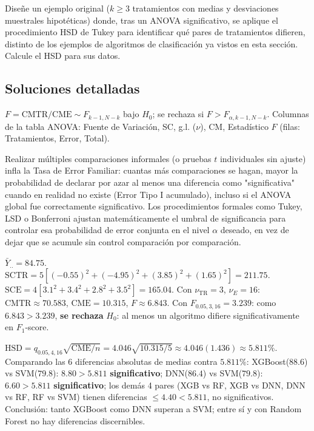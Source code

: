 \begin{problema}
	\label{prob:2ed3d37}
	Diseñe un ejemplo original ($k\ge3$ tratamientos con medias y desviaciones muestrales hipotéticas) donde, tras un ANOVA significativo, se aplique el procedimiento HSD de Tukey para identificar qué pares de tratamientos difieren, distinto de los ejemplos de algoritmos de clasificación ya vistos en esta sección. Calcule el HSD para sus datos.
\end{problema}

\subsection*{Soluciones detalladas}

\begin{solproblema}[prob:83dd109]
	$F = \text{CMTR}/\text{CME} \sim F_{k-1,N-k}$ bajo $H_0$; se rechaza si $F>F_{\alpha,k-1,N-k}$. Columnas de la tabla ANOVA: Fuente de Variación, SC, g.l. ($\nu$), CM, Estadístico $F$ (filas: Tratamientos, Error, Total).
\end{solproblema}

\begin{solproblema}[prob:e959af7]
	Realizar múltiples comparaciones informales (o pruebas $t$ individuales sin ajuste) infla la Tasa de Error Familiar: cuantas más comparaciones se hagan, mayor la probabilidad de declarar por azar al menos una diferencia como "significativa" cuando en realidad no existe (Error Tipo I acumulado), incluso si el ANOVA global fue correctamente significativo. Los procedimientos formales como Tukey, LSD o Bonferroni ajustan matemáticamente el umbral de significancia para controlar esa probabilidad de error conjunta en el nivel $\alpha$ deseado, en vez de dejar que se acumule sin control comparación por comparación.
\end{solproblema}

\begin{solproblema}
	$\bar Y_{..}=84.75$. $\text{SCTR}=5[(-0.55)^2+(-4.95)^2+(3.85)^2+(1.65)^2]=211.75$. $\text{SCE}=4[3.1^2+3.4^2+2.8^2+3.5^2]=165.04$. Con $\nu_{\text{TR}}=3$, $\nu_E=16$: $\text{CMTR}\approx70.583$, $\text{CME}=10.315$, $F\approx6.843$. Con $F_{0.05,3,16}=3.239$: como $6.843>3.239$, \textbf{se rechaza} $H_0$: al menos un algoritmo difiere significativamente en $F_1$-score.
\end{solproblema}

\begin{solproblema}
	$\text{HSD} = q_{0.05,4,16}\sqrt{\text{CME}/n} = 4.046\sqrt{10.315/5} \approx4.046(1.436)\approx5.811\%$. Comparando las 6 diferencias absolutas de medias contra $5.811\%$: XGBoost($88.6$) vs SVM($79.8$): $8.80>5.811$ \textbf{significativo}; DNN($86.4$) vs SVM($79.8$): $6.60>5.811$ \textbf{significativo}; los demás 4 pares (XGB vs RF, XGB vs DNN, DNN vs RF, RF vs SVM) tienen diferencias $\le4.40<5.811$, no significativos. Conclusión: tanto XGBoost como DNN superan a SVM; entre sí y con Random Forest no hay diferencias discernibles.
\end{solproblema}

